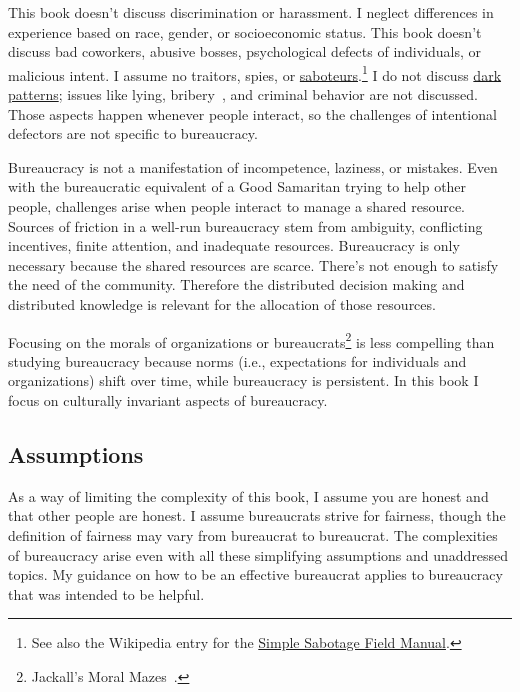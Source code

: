 This book doesn't discuss discrimination or harassment. I neglect differences in experience based on race, gender, or socioeconomic status. This book doesn't discuss bad coworkers, abusive bosses, psychological defects of individuals, or malicious intent. I assume no traitors, spies, \iftoggle{WPinmargin}{\marginpar{[Wikipedia] saboteurs}}{}
or \href{https://www.hsdl.org/?abstract&did=750070}{saboteurs}.\footnote{See also the Wikipedia entry for the \href{https://en.wikisource.org/wiki/Simple_Sabotage_Field_Manual}{Simple Sabotage Field Manual}.
}
I do not discuss \href{https://en.wikipedia.org/wiki/Dark_pattern}{dark patterns}; 
issues like lying, bribery~\cite{2021_Ang}, and criminal behavior are not discussed. Those aspects happen whenever people interact, so  the challenges of intentional defectors are not specific to bureaucracy. 

Bureaucracy is not a manifestation of incompetence, laziness, or mistakes.
Even with the bureaucratic equivalent of a Good Samaritan trying to help other people, challenges arise when people interact to manage a shared resource. 
Sources of friction in a well-run bureaucracy stem from  ambiguity, conflicting incentives, finite attention, and inadequate resources. Bureaucracy is only necessary because the shared resources are scarce. There's not enough to satisfy the need of the community. Therefore the distributed decision making and distributed knowledge is relevant for the allocation of those resources.



Focusing on the morals of organizations or bureaucrats\footnote{Jackall's Moral Mazes~\cite{2009_Jackall}.} is less compelling than studying bureaucracy because norms (i.e., expectations for individuals and organizations) shift over time, while bureaucracy is persistent. 
In this book I focus on culturally invariant aspects of bureaucracy. 


\subsection*{Assumptions}
As a way of limiting the complexity of this book, I assume you are honest and that other people are honest. 
I assume bureaucrats strive for fairness, though the definition of fairness may vary from bureaucrat to bureaucrat. 
The complexities of bureaucracy arise even with all these simplifying assumptions and unaddressed topics. My guidance on how to be an effective bureaucrat applies to  bureaucracy that was intended to be helpful.



